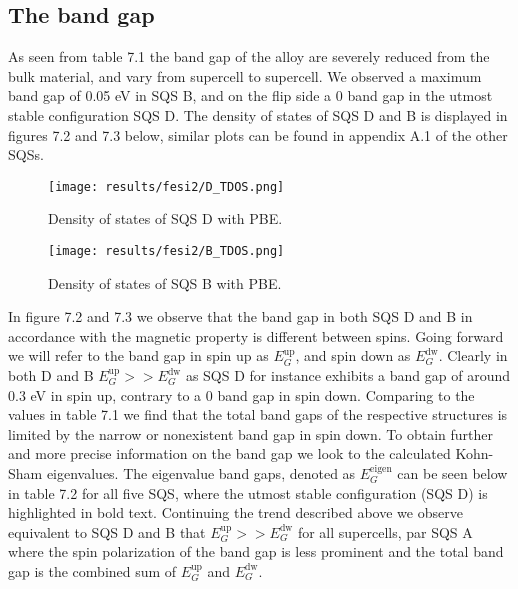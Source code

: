 \newpage
\subsection{The band gap}
As seen from table 7.1 the band gap of the alloy are severely reduced from the bulk material, and vary from supercell to supercell. We observed a maximum band gap of 0.05 eV in SQS B, and on the flip side a 0 band gap in the utmost stable configuration SQS D. The density of states of SQS D and B is displayed in figures 7.2 and 7.3 below, similar plots can be found in appendix A.1 of the other SQSs. 

\begin{figure}[H]
	\centering
	\texttt{[image: results/fesi2/D\_TDOS.png]}
	\caption{Density of states of SQS D  with PBE.}
\end{figure}

\begin{figure}[H]
\centering
	\texttt{[image: results/fesi2/B\_TDOS.png]}
	\caption{Density of states of SQS B  with PBE.}
\end{figure}  

In figure 7.2  and 7.3 we observe that the band gap in both SQS D and B in accordance with the magnetic property is different between spins. Going forward we will refer to the band gap in spin up as $E_G ^\text{up}$, and spin down as $E_G ^\text{dw}$. Clearly in both D and B $E_G ^\text{up} >> E_G ^\text{dw}$ as SQS D for instance exhibits a band gap of around 0.3 eV in spin up, contrary to a 0 band gap in spin down. Comparing to the values in table 7.1 we find that the total band gaps of the respective structures is limited by the narrow or nonexistent band gap in spin down. To obtain further and more precise information on the band gap we look to the calculated Kohn-Sham eigenvalues. The eigenvalue band gaps, denoted as $E_G ^\text{eigen}$ can be seen below in table 7.2 for all five SQS, where the utmost stable configuration (SQS D) is highlighted in bold text. Continuing the trend described above we observe equivalent to SQS D and B that $E_G ^\text{up} >> E_G ^\text{dw}$ for all supercells, par SQS A where the spin polarization of the band gap is less prominent and the total band gap is the combined sum of $E_G ^\text{up}$ and $E_G ^\text{dw}$.

